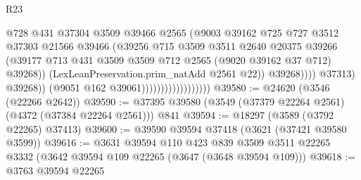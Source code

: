 \begin{lexlean}{R23}
\begin{coremodule}
                                                    @728
                                                    @431
                                                    @37304
                                                    @3509
                                                    @39466
                                                    @2565
                                                    (@9003
                                                      @39162
                                                      @725
                                                      @727
                                                      @3512
                                                      @37303
                                                      @21566
                                                      @39466
                                                      (@39256
                                                        @715
                                                        @3509
                                                        @3511
                                                        @2640
                                                        @20375
                                                        @39266
                                                        (@39177
                                                          @713
                                                          @431
                                                          @3509
                                                          @3509
                                                          @712
                                                          @2565
                                                          (@9020 @39162 @37 @712)
                                                          @39268))
                                                      (LexLeanPreservation.prim_natAdd @2561 @22))
                                                    @39268))))
                                            @37313)
                                          @39268))
                                      (@9051 @162 @39061))))))))))))))))))
@39580 := @24620 (@3546 (@22266 @2642))
@39590 := @37395 @39580 (@3549 (@37379 @22264 @2561) (@4372 (@37384 @22264 @2561))) @841
@39594 := @18297 (@3589 (@3792 @22265) @37413)
@39600 := @39590 @39594 @37418 (@3621 (@37421 @39580 @3599))
@39616 := @3631
    @39594
    @110
    @423
    @839
    @3509
    @3511
    @22265
    @3332
    (@3642 @39594 @109 @22265 (@3647 (@3648 @39594 @109)))
@39618 := @3763 @39594 @22265

\end{coremodule}
\end{lexlean}
